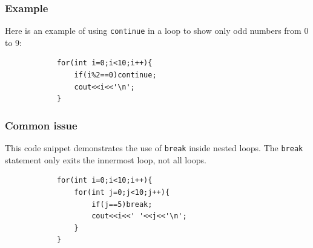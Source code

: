 \documentclass[xcolor=dvipsnames]{beamer}
\begin{document}
    \begin{frame}[fragile]
        \frametitle{Example}
        Here is an example of using \texttt{continue} in a loop to show only odd numbers from 0 to 9:
        \begin{verbatim}
            for(int i=0;i<10;i++){
                if(i%2==0)continue;
                cout<<i<<'\n';
            }
        \end{verbatim}
    \end{frame}
    \begin{frame}[fragile]
        \frametitle{Common issue}
        This code snippet demonstrates the use of \texttt{break} inside nested loops. The \texttt{break} statement only exits the innermost loop, not all loops.
        \begin{verbatim}
            for(int i=0;i<10;i++){
                for(int j=0;j<10;j++){
                    if(j==5)break;
                    cout<<i<<' '<<j<<'\n';
                }
            }            
        \end{verbatim}
    \end{frame}

    
\end{document}

